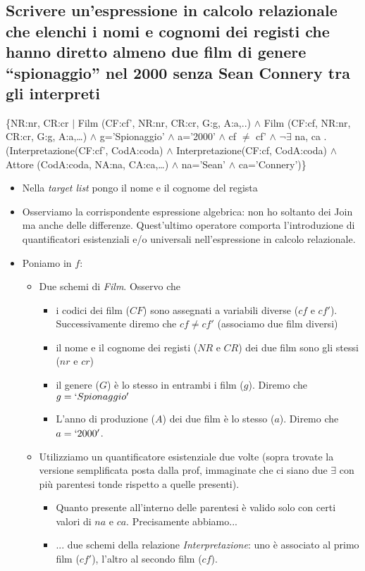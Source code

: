 \subsection*{Scrivere un’espressione in calcolo relazionale che elenchi i nomi e cognomi dei registi che hanno diretto almeno due film di genere “spionaggio” nel 2000 senza Sean Connery tra gli interpreti}
\{NR:nr, CR:cr $|$ Film (CF:cf’, NR:nr, CR:cr, G:g, A:a,..) $\land$ Film (CF:cf, NR:nr, CR:cr, G:g, A:a,\dots) $\land$
g=’Spionaggio’ $\land$ a=’2000’ $\land$ cf $\neq$ cf’ $\land$ $\neg\exists$ na, ca . (Interpretazione(CF:cf’, CodA:coda) $\land$
Interpretazione(CF:cf, CodA:coda) $\land$ Attore (CodA:coda, NA:na, CA:ca,\dots) $\land$
na=’Sean’ $\land$ ca=’Connery’)\}
\begin{itemize}
	\item Nella \emph{target list} pongo il nome e il cognome del regista
	\item Osserviamo la corrispondente espressione algebrica: non ho soltanto dei Join ma anche delle differenze. Quest'ultimo operatore comporta l'introduzione di quantificatori esistenziali e/o universali nell'espressione in calcolo relazionale.
	\item Poniamo in $f$:
	\begin{itemize}
		\item Due schemi di \emph{Film}. Osservo che 
		\begin{itemize}
			\item i codici dei film ($CF$) sono assegnati a variabili diverse ($cf$ e $cf'$). Successivamente diremo che $cf \neq cf'$ (associamo due film diversi)
			\item il nome e il cognome dei registi ($NR$ e $CR$) dei due film sono gli stessi ($nr$ e $cr$)
			\item il genere ($G$) è lo stesso in entrambi i film ($g$). Diremo che $g = `Spionaggio'$
			\item L'anno di produzione ($A$) dei due film è lo stesso ($a$). Diremo che $a = `2000'$.
		\end{itemize}
		\item Utilizziamo un quantificatore esistenziale due volte (sopra trovate la versione semplificata posta dalla prof, immaginate che ci siano due $\exists$ con più parentesi tonde rispetto a quelle presenti).
		\begin{itemize}
			\item Quanto presente all'interno delle parentesi è valido solo con certi valori di $na$ e $ca$. Precisamente abbiamo...
			\item ... due schemi della relazione \emph{Interpretazione}: uno è associato al primo film ($cf'$), l'altro al secondo film ($cf$).

\end{itemize}
\end{itemize}
\end{itemize}
